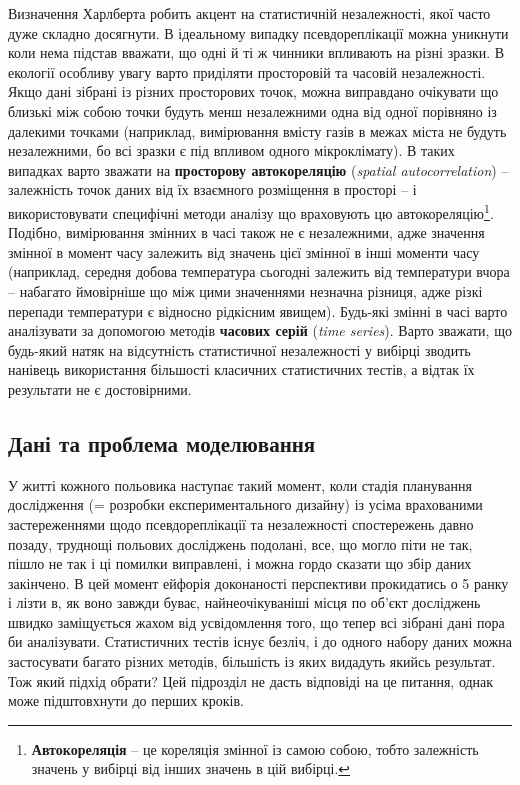 \documentclass[
  11pt,
]{book}
\begin{document}
Визначення Харлберта робить акцент на статистичній незалежності, якої часто дуже складно досягнути. В ідеальному випадку псевдореплікації можна уникнути коли нема підстав вважати, що одні й ті ж чинники впливають на різні зразки. В екології особливу увагу варто приділяти просторовій та часовій незалежності. Якщо дані зібрані із різних просторових точок, можна виправдано очікувати що близькі між собою точки будуть менш незалежними одна від одної порівняно із далекими точками (наприклад, вимірювання вмісту газів в межах міста не будуть незалежними, бо всі зразки є під впливом одного мікроклімату). В таких випадках варто зважати на \textbf{просторову автокореляцію} (\emph{spatial autocorrelation}) -- залежність точок даних від їх взаємного розміщення в просторі -- і використовувати специфічні методи аналізу що враховують цю автокореляцію\footnote{\textbf{Автокореляція} -- це кореляція змінної із самою собою, тобто залежність значень у вибірці від інших значень в цій вибірці.}. Подібно, вимірювання змінних в часі також не є незалежними, адже значення змінної в момент часу залежить від значень цієї змінної в інші моменти часу (наприклад, середня добова температура сьогодні залежить від температури вчора -- набагато ймовірніше що між цими значеннями незначна різниця, адже різкі перепади температури є відносно рідкісним явищем). Будь-які змінні в часі варто аналізувати за допомогою методів \textbf{часових серій} (\emph{time series}). Варто зважати, що будь-який натяк на відсутність статистичної незалежності у вибірці зводить нанівець використання більшості класичних статистичних тестів, а відтак їх результати не є достовірними.

\subsection{Дані та проблема моделювання}\label{regression}

У житті кожного польовика наступає такий момент, коли стадія планування дослідження (= розробки експериментального дизайну) із усіма врахованими застереженнями щодо псевдореплікації та незалежності спостережень давно позаду, труднощі польових досліджень подолані, все, що могло піти не так, пішло не так і ці помилки виправлені, і можна гордо сказати що збір даних закінчено. В цей момент ейфорія доконаності перспективи прокидатись о 5 ранку і лізти в, як воно завжди буває, найнеочікуваніші місця по об'єкт досліджень швидко заміщується жахом від усвідомлення того, що тепер всі зібрані дані пора би аналізувати. Статистичних тестів існує безліч, і до одного набору даних можна застосувати багато різних методів, більшість із яких видадуть якийсь результат. Тож який підхід обрати? Цей підрозділ не дасть відповіді на це питання, однак може підштовхнути до перших кроків.
\end{document}
